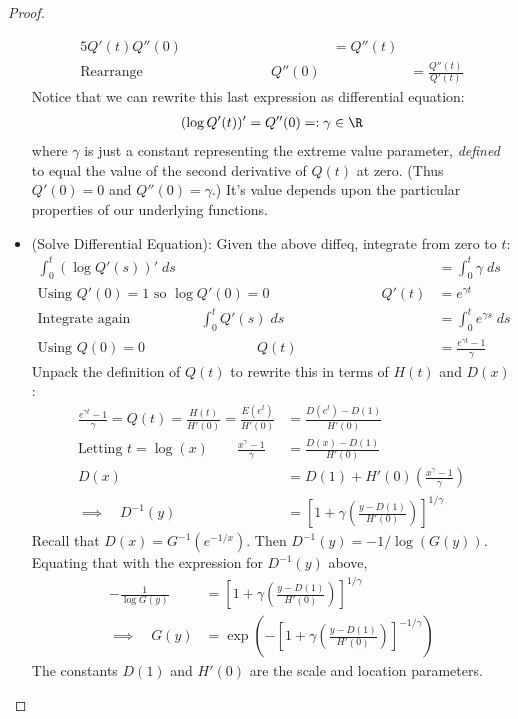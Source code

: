 \documentclass[12pt]{article}
\theoremstyle{plain}
\theoremstyle{definition}
\theoremstyle{remark}
\begin{document}
\begin{proof}
\begin{itemize}
\begin{alignat*}{5}
      Q'(t)Q''(0)
      &&= Q''(t)
      \\
      \text{Rearrange}\qquad
      &
      \qquad\qquad\quad\;\;
      Q''(0)
      &&=
      \frac{Q''(t)}{Q'(t)}
    \end{alignat*}
    Notice that we can rewrite this last expression as differential
    equation:
    \begin{align*}
      (\log Q'(t))'=Q''(0)=:\gamma\in\R
    \end{align*}
    where $\gamma$ is just a constant representing the extreme value
    parameter, \emph{defined} to equal the value
    of the second derivative of $Q(t)$ at zero.
    (Thus $Q'(0)=0$ and $Q''(0)=\gamma$.)
    It's value depends upon the particular properties of our underlying
    functions.

  \item
    (Solve Differential Equation):
    Given the above diffeq, integrate from zero to $t$:
    \begin{align*}
      \int_0^t (\log Q'(s))'\;ds
      &= \int_0^t \gamma \;ds
      \\
      \text{Using $Q'(0)=1$ so $\log Q'(0)=0$}
      \qquad\qquad\qquad\qquad
      Q'(t)
      &= e^{\gamma t}
      \\
      \text{Integrate again}
      \qquad\qquad\quad
      \int_0^t Q'(s)\;ds
      &= \int_0^t e^{\gamma s}\;ds
      \\
      \text{Using $Q(0)=0$}
      \qquad\qquad\qquad\qquad
      Q(t)
      &= \frac{e^{\gamma t}-1}{\gamma}
    \end{align*}
    Unpack the definition of $Q(t)$ to rewrite this in terms of $H(t)$
    and $D(x)$:
    \begin{align*}
      \frac{e^{\gamma t}-1}{\gamma}
      = Q(t)
      = \frac{H(t)}{H'(0)}
      = \frac{E(e^t)}{H'(0)}
      &= \frac{D(e^t)-D(1)}{H'(0)}
      \\
      \text{Letting $t=\log(x)$}\qquad
      \frac{x^{\gamma}-1}{\gamma}
      &= \frac{D(x)-D(1)}{H'(0)}
      \\
      D(x)
      &=
      D(1)+H'(0)\left(\frac{x^{\gamma}-1}{\gamma}\right)
      \\
      \implies\quad
      D^{-1}(y)
      &=
      \left[
      1+\gamma\left(\frac{y-D(1)}{H'(0)}\right)
      \right]^{1/\gamma}
    \end{align*}
    Recall that $D(x)=G^{-1}(e^{-1/x})$.
    Then $D^{-1}(y)=-1/\log(G(y))$.
    Equating that with the expression for $D^{-1}(y)$ above,
    \begin{align*}
      -\frac{1}{\log G(y)}
      &=
      \left[
      1+\gamma\left(\frac{y-D(1)}{H'(0)}\right)
      \right]^{1/\gamma}
      \\
      \implies\quad
      G(y)
      &=
      \exp\left(
      -\left[
      1+\gamma\left(\frac{y-D(1)}{H'(0)}\right)
      \right]^{-1/\gamma}
      \right)
    \end{align*}
    The constants $D(1)$ and $H'(0)$ are the scale and location
    parameters.




\end{itemize}
\end{proof}
\end{document}
